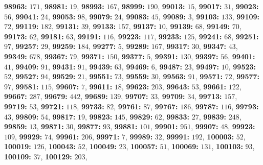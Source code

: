 \textsf{\bfseries 98963:} $171$, \textsf{\bfseries 98981:} $19$, \textsf{\bfseries 98993:} $167$, \textsf{\bfseries 98999:} $190$, \textsf{\bfseries 99013:} $15$, \textsf{\bfseries 99017:} $31$, \textsf{\bfseries 99023:} $56$, \textsf{\bfseries 99041:} $24$, \textsf{\bfseries 99053:} $98$, \textsf{\bfseries 99079:} $24$, \textsf{\bfseries 99083:} $45$, \textsf{\bfseries 99089:} $3$, \textsf{\bfseries 99103:} $133$, \textsf{\bfseries 99109:} $72$, \textsf{\bfseries 99119:} $182$, \textsf{\bfseries 99131:} $39$, \textsf{\bfseries 99133:} $157$, \textsf{\bfseries 99137:} $10$, \textsf{\bfseries 99139:} $68$, \textsf{\bfseries 99149:} $70$, \textsf{\bfseries 99173:} $62$, \textsf{\bfseries 99181:} $63$, \textsf{\bfseries 99191:} $116$, \textsf{\bfseries 99223:} $117$, \textsf{\bfseries 99233:} $125$, \textsf{\bfseries 99241:} $68$, \textsf{\bfseries 99251:} $97$, \textsf{\bfseries 99257:} $29$, \textsf{\bfseries 99259:} $184$, \textsf{\bfseries 99277:} $5$, \textsf{\bfseries 99289:} $167$, \textsf{\bfseries 99317:} $30$, \textsf{\bfseries 99347:} $43$, \textsf{\bfseries 99349:} $678$, \textsf{\bfseries 99367:} $79$, \textsf{\bfseries 99371:} $150$, \textsf{\bfseries 99377:} $5$, \textsf{\bfseries 99391:} $130$, \textsf{\bfseries 99397:} $56$, \textsf{\bfseries 99401:} $41$, \textsf{\bfseries 99409:} $91$, \textsf{\bfseries 99431:} $91$, \textsf{\bfseries 99439:} $63$, \textsf{\bfseries 99469:} $6$, \textsf{\bfseries 99487:} $23$, \textsf{\bfseries 99497:} $10$, \textsf{\bfseries 99523:} $52$, \textsf{\bfseries 99527:} $94$, \textsf{\bfseries 99529:} $21$, \textsf{\bfseries 99551:} $73$, \textsf{\bfseries 99559:} $30$, \textsf{\bfseries 99563:} $91$, \textsf{\bfseries 99571:} $72$, \textsf{\bfseries 99577:} $97$, \textsf{\bfseries 99581:} $115$, \textsf{\bfseries 99607:} $7$, \textsf{\bfseries 99611:} $18$, \textsf{\bfseries 99623:} $203$, \textsf{\bfseries 99643:} $53$, \textsf{\bfseries 99661:} $122$, \textsf{\bfseries 99667:} $287$, \textsf{\bfseries 99679:} $442$, \textsf{\bfseries 99689:} $139$, \textsf{\bfseries 99707:} $33$, \textsf{\bfseries 99709:} $34$, \textsf{\bfseries 99713:} $157$, \textsf{\bfseries 99719:} $53$, \textsf{\bfseries 99721:} $118$, \textsf{\bfseries 99733:} $82$, \textsf{\bfseries 99761:} $87$, \textsf{\bfseries 99767:} $186$, \textsf{\bfseries 99787:} $116$, \textsf{\bfseries 99793:} $43$, \textsf{\bfseries 99809:} $54$, \textsf{\bfseries 99817:} $19$, \textsf{\bfseries 99823:} $145$, \textsf{\bfseries 99829:} $62$, \textsf{\bfseries 99833:} $27$, \textsf{\bfseries 99839:} $248$, \textsf{\bfseries 99859:} $13$, \textsf{\bfseries 99871:} $30$, \textsf{\bfseries 99877:} $93$, \textsf{\bfseries 99881:} $101$, \textsf{\bfseries 99901:} $951$, \textsf{\bfseries 99907:} $48$, \textsf{\bfseries 99923:} $109$, \textsf{\bfseries 99929:} $74$, \textsf{\bfseries 99961:} $206$, \textsf{\bfseries 99971:} $7$, \textsf{\bfseries 99989:} $32$, \textsf{\bfseries 99991:} $192$, \textsf{\bfseries 100003:} $52$, \textsf{\bfseries 100019:} $126$, \textsf{\bfseries 100043:} $52$, \textsf{\bfseries 100049:} $23$, \textsf{\bfseries 100057:} $51$, \textsf{\bfseries 100069:} $131$, \textsf{\bfseries 100103:} $93$, \textsf{\bfseries 100109:} $37$, \textsf{\bfseries 100129:} $203$, 
